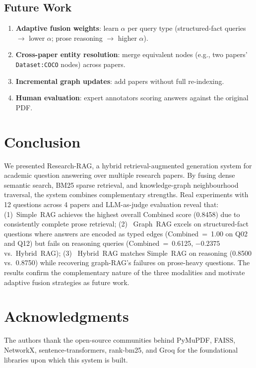 \documentclass[conference]{IEEEtran}
\begin{document}
\subsection{Future Work}

\begin{enumerate}
  \item \textbf{Adaptive fusion weights}: learn $\alpha$ per query type
  (structured-fact queries $\to$ lower $\alpha$; prose reasoning $\to$
  higher $\alpha$).
  \item \textbf{Cross-paper entity resolution}: merge equivalent nodes
  (e.g., two papers' \texttt{Dataset:COCO} nodes) across papers.
  \item \textbf{Incremental graph updates}: add papers without full
  re-indexing.
  \item \textbf{Human evaluation}: expert annotators scoring answers
  against the original PDF.
\end{enumerate}

\section{Conclusion}
\label{sec:conclusion}

We presented Research-RAG, a hybrid retrieval-augmented generation
system for academic question answering over multiple research papers. By
fusing dense semantic search, BM25 sparse retrieval, and knowledge-graph
neighbourhood traversal, the system combines complementary strengths.
Real experiments with 12 questions across 4 papers and LLM-as-judge
evaluation reveal that: (1)~Simple~RAG achieves the highest overall
Combined score (0.8458) due to consistently complete prose retrieval; (2)~
Graph~RAG excels on structured-fact questions where answers are encoded
as typed edges (Combined~=~1.00 on Q02 and Q12) but fails on
reasoning queries (Combined~=~0.6125, $-0.2375$ vs.\ Hybrid~RAG); (3)~
Hybrid~RAG matches Simple~RAG on reasoning (0.8500 vs.\ 0.8750) while
recovering graph-RAG's failures on prose-heavy questions.
The results confirm the complementary nature of the three modalities and
motivate adaptive fusion strategies as future work.

\section*{Acknowledgments}
The authors thank the open-source communities behind PyMuPDF,
FAISS, NetworkX, sentence-transformers, rank-bm25, and Groq for
the foundational libraries upon which this system is built.
\end{document}
